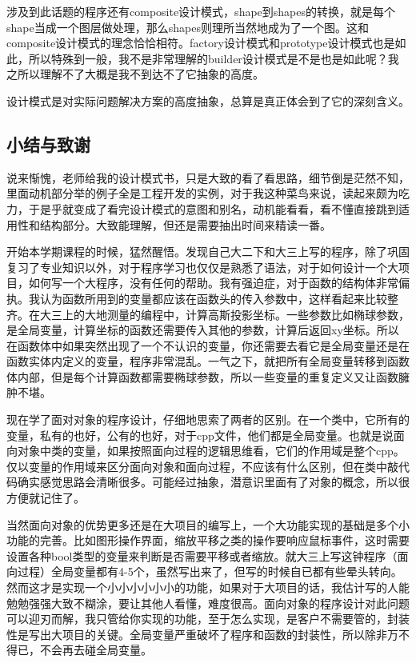\documentclass[a4paper,16pt,UTF8]{article}
\begin{document}
        涉及到此话题的程序还有composite设计模式，shape到shapes的转换，就是每个shape当成一个图层做处理，那么shapes则理所当然地成为了一个图。这和composite设计模式的理念恰恰相符。factory设计模式和prototype设计模式也是如此，所以特殊到一般，我不是非常理解的builder设计模式是不是也是如此呢？我之所以理解不了大概是我不到达不了它抽象的高度。

        设计模式是对实际问题解决方案的高度抽象，总算是真正体会到了它的深刻含义。


    \subsection{\Large 小结与致谢}

        说来惭愧，老师给我的设计模式书，只是大致的看了看思路，细节倒是茫然不知，里面动机部分举的例子全是工程开发的实例，对于我这种菜鸟来说，读起来颇为吃力，于是乎就变成了看完设计模式的意图和别名，动机能看看，看不懂直接跳到适用性和结构部分。大致能理解，但还是需要抽出时间来精读一番。

        开始本学期课程的时候，猛然醒悟。发现自己大二下和大三上写的程序，除了巩固复习了专业知识以外，对于程序学习也仅仅是熟悉了语法，对于如何设计一个大项目，如何写一个大程序，没有任何的帮助。我有强迫症，对于函数的结构体非常偏执。我认为函数所用到的变量都应该在函数头的传入参数中，这样看起来比较整齐。在大三上的大地测量的编程中，计算高斯投影坐标。一些参数比如椭球参数，是全局变量，计算坐标的函数还需要传入其他的参数，计算后返回xy坐标。所以在函数体中如果突然出现了一个不认识的变量，你还需要去看它是全局变量还是在函数实体内定义的变量，程序非常混乱。一气之下，就把所有全局变量转移到函数体内部，但是每个计算函数都需要椭球参数，所以一些变量的重复定义又让函数臃肿不堪。

        现在学了面对对象的程序设计，仔细地思索了两者的区别。在一个类中，它所有的变量，私有的也好，公有的也好，对于cpp文件，他们都是全局变量。也就是说面向对象中类的变量，如果按照面向过程的逻辑思维看，它们的作用域是整个cpp。仅以变量的作用域来区分面向对象和面向过程，不应该有什么区别，但在类中敲代码确实感觉思路会清晰很多。可能经过抽象，潜意识里面有了对象的概念，所以很方便就记住了。

        当然面向对象的优势更多还是在大项目的编写上，一个大功能实现的基础是多个小功能的完善。比如图形操作界面，缩放平移之类的操作要响应鼠标事件，这时需要设置各种bool类型的变量来判断是否需要平移或者缩放。就大三上写这钟程序（面向过程）全局变量都有4-5个，虽然写出来了，但写的时候自已都有些晕头转向。然而这才是实现一个小小小小小小的功能，如果对于大项目的话，我估计写的人能勉勉强强大致不糊涂，要让其他人看懂，难度很高。面向对象的程序设计对此问题可以迎刃而解，我只管给你实现的功能，至于怎么实现，是客户不需要管的，封装性是写出大项目的关键。全局变量严重破坏了程序和函数的封装性，所以除非万不得已，不会再去碰全局变量。
\end{document}
